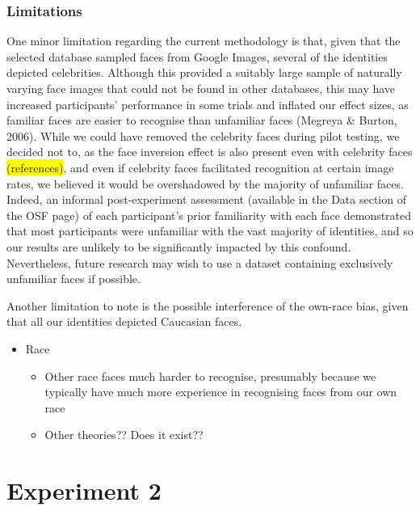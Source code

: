 \documentclass[
  english,
  man]{apa6}
\providecommand{\tightlist}{%
  \setlength{\itemsep}{0pt}\setlength{\parskip}{0pt}}
\begin{document}
\hypertarget{limitations}{%
\subsubsection{Limitations}\label{limitations}}

One minor limitation regarding the current methodology is that, given that the selected database sampled faces from Google Images, several of the identities depicted celebrities. Although this provided a suitably large sample of naturally varying face images that could not be found in other databases, this may have increased participants' performance in some trials and inflated our effect sizes, as familiar faces are easier to recognise than unfamiliar faces (Megreya \& Burton, 2006). While we could have removed the celebrity faces during pilot testing, we decided not to, as the face inversion effect is also present even with celebrity faces \colorbox{yellow}{(references)}, and even if celebrity faces facilitated recognition at certain image rates, we believed it would be overshadowed by the majority of unfamiliar faces. Indeed, an informal post-experiment assessment (available in the Data section of the OSF page) of each participant's prior familiarity with each face demonstrated that most participants were unfamiliar with the vast majority of identities, and so our results are unlikely to be significantly impacted by this confound. Nevertheless, future research may wish to use a dataset containing exclusively unfamiliar faces if possible.

Another limitation to note is the possible interference of the own-race bias, given that all our identities depicted Caucasian faces.

\begin{itemize}
\tightlist
\item
  Race

  \begin{itemize}
  \tightlist
  \item
    Other race faces much harder to recognise, presumably because we typically have much more experience in recognising faces from our own race
  \item
    Other theories?? Does it exist??
  \end{itemize}
\end{itemize}

\hypertarget{experiment-2}{%
\section{Experiment 2}\label{experiment-2}}
\end{document}
